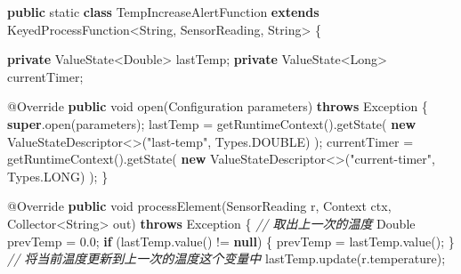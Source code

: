 \documentclass[cn,11pt,chinese]{elegantbook}
\newenvironment{Shaded}{}{}
\newcommand{\AttributeTok}[1]{\textcolor[rgb]{0.49,0.56,0.16}{#1}}
\newcommand{\BuiltInTok}[1]{#1}
\newcommand{\CommentTok}[1]{\textcolor[rgb]{0.38,0.63,0.69}{\textit{#1}}}
\newcommand{\DataTypeTok}[1]{\textcolor[rgb]{0.56,0.13,0.00}{#1}}
\newcommand{\DecValTok}[1]{\textcolor[rgb]{0.25,0.63,0.44}{#1}}
\newcommand{\FloatTok}[1]{\textcolor[rgb]{0.25,0.63,0.44}{#1}}
\newcommand{\FunctionTok}[1]{\textcolor[rgb]{0.02,0.16,0.49}{#1}}
\newcommand{\KeywordTok}[1]{\textcolor[rgb]{0.00,0.44,0.13}{\textbf{#1}}}
\newcommand{\NormalTok}[1]{#1}
\newcommand{\StringTok}[1]{\textcolor[rgb]{0.25,0.44,0.63}{#1}}
\begin{document}
\begin{Shaded}
\begin{Highlighting}[]
\KeywordTok{public} \DataTypeTok{static} \KeywordTok{class}\NormalTok{ TempIncreaseAlertFunction }\KeywordTok{extends}\NormalTok{ KeyedProcessFunction\textless{}}\BuiltInTok{String}\NormalTok{, SensorReading, }\BuiltInTok{String}\NormalTok{\textgreater{} \{}

    \KeywordTok{private}\NormalTok{ ValueState\textless{}}\BuiltInTok{Double}\NormalTok{\textgreater{} lastTemp;}
    \KeywordTok{private}\NormalTok{ ValueState\textless{}}\BuiltInTok{Long}\NormalTok{\textgreater{} currentTimer;}

    \AttributeTok{@Override}
    \KeywordTok{public} \DataTypeTok{void} \FunctionTok{open}\NormalTok{(}\BuiltInTok{Configuration}\NormalTok{ parameters) }\KeywordTok{throws} \BuiltInTok{Exception}\NormalTok{ \{}
        \KeywordTok{super}\NormalTok{.}\FunctionTok{open}\NormalTok{(parameters);}
\NormalTok{        lastTemp = }\FunctionTok{getRuntimeContext}\NormalTok{().}\FunctionTok{getState}\NormalTok{(}
                \KeywordTok{new}\NormalTok{ ValueStateDescriptor\textless{}\textgreater{}(}\StringTok{"last{-}temp"}\NormalTok{, }\BuiltInTok{Types}\NormalTok{.}\FunctionTok{DOUBLE}\NormalTok{)}
\NormalTok{        );}
\NormalTok{        currentTimer = }\FunctionTok{getRuntimeContext}\NormalTok{().}\FunctionTok{getState}\NormalTok{(}
                \KeywordTok{new}\NormalTok{ ValueStateDescriptor\textless{}\textgreater{}(}\StringTok{"current{-}timer"}\NormalTok{, }\BuiltInTok{Types}\NormalTok{.}\FunctionTok{LONG}\NormalTok{)}
\NormalTok{        );}
\NormalTok{    \}}

    \AttributeTok{@Override}
    \KeywordTok{public} \DataTypeTok{void} \FunctionTok{processElement}\NormalTok{(SensorReading r, }\BuiltInTok{Context}\NormalTok{ ctx, Collector\textless{}}\BuiltInTok{String}\NormalTok{\textgreater{} out) }\KeywordTok{throws} \BuiltInTok{Exception}\NormalTok{ \{}
        \CommentTok{// 取出上一次的温度}
        \BuiltInTok{Double}\NormalTok{ prevTemp = }\FloatTok{0.}\DecValTok{0}\NormalTok{;}
        \KeywordTok{if}\NormalTok{ (lastTemp.}\FunctionTok{value}\NormalTok{() != }\KeywordTok{null}\NormalTok{) \{}
\NormalTok{            prevTemp = lastTemp.}\FunctionTok{value}\NormalTok{();}
\NormalTok{        \}}
        \CommentTok{// 将当前温度更新到上一次的温度这个变量中}
\NormalTok{        lastTemp.}\FunctionTok{update}\NormalTok{(r.}\FunctionTok{temperature}\NormalTok{);}


\end{Highlighting}
\end{Shaded}
\end{document}
